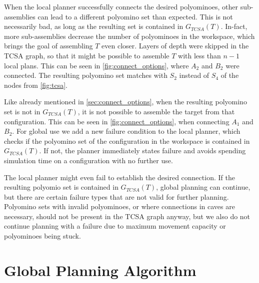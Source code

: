 When the local planner successfully connects the desired polyominoes, other sub-assemblies can lead to a different polyomino set than expected.
This is not necessarily bad, as long as the resulting set is contained in $G_{TCSA}(T)$.
In-fact, more sub-assemblies decrease the number of polyominoes in the workspace, which brings the goal of assembling $T$ even closer.
Layers of depth were skipped in the TCSA graph, so that it might be possible to assemble $T$ with less than $n-1$ local plans.
This can be seen in \autoref{fig:connect_options}, where $A_2$ and $B_2$ were connected. 
The resulting polyomino set matches with $S_2$ instead of $S_4$ of the nodes from \autoref{fig:tcsa}.

Like already mentioned in \autoref{sec:connect_options}, when the resulting polyomino set is not in $G_{TCSA}(T)$, it is not possible to assemble the target from that configuration.
This can be seen in \autoref{fig:connect_options}, when connecting $A_1$ and $B_2$.
For global use we add a new failure condition to the local planner, which checks if the polyomino set of the configuration in the workspace is contained in $G_{TCSA}(T)$.
If not, the planner immediately states failure and avoids spending simulation time on a configuration with no further use.

The local planner might even fail to establish the desired connection.
If the resulting polyomio set is contained in $G_{TCSA}(T)$, global planning can continue, but there are certain failure types that are not valid for further planning.
Polyomino sets with invalid polyominoes, or where connections in caves are necessary, should not be present in the TCSA graph anyway, but we also do not continue planning with a failure due to maximum movement capacity or polyominoes being stuck.




\section{Global Planning Algorithm}
\label{sec:global_algo}



